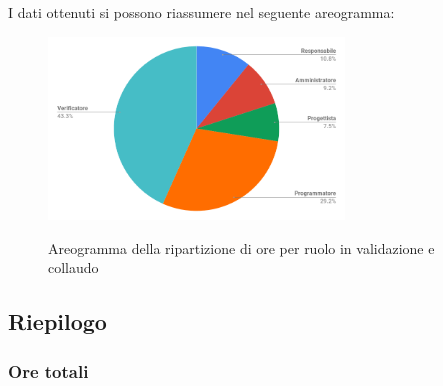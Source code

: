 \pagebreak
I dati ottenuti si possono riassumere nel seguente areogramma:
\begin{figure}[H] 
			\centering 
				\includegraphics[width=0.7\textwidth]{res/images/areogramma_validazione.png}\\
				\caption{Areogramma della ripartizione di ore per ruolo in validazione e collaudo}
			\label{AreogrammaValidazione}
\end{figure}


\subsection{Riepilogo}
\subsubsection{Ore totali}
